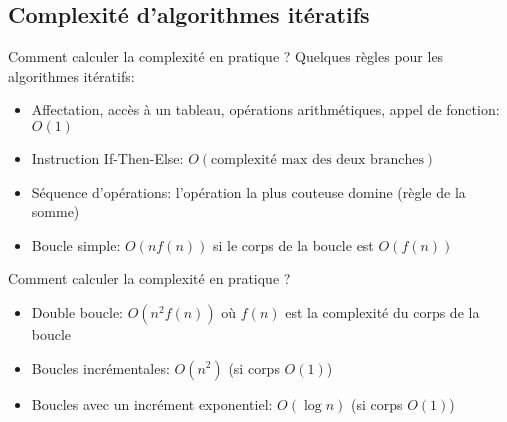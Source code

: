\subsection{Complexité d'algorithmes itératifs}

\begin{frame}{Comment calculer la complexité en pratique ?}
Quelques règles pour les algorithmes itératifs:
\begin{itemize}
\item Affectation, accès à un tableau, opérations arithmétiques, appel de fonction: $O(1)$
\item Instruction If-Then-Else: $O(\mbox{complexité max des deux branches})$
\item Séquence d'opérations: l'opération la plus couteuse domine (règle de la somme)
\item Boucle simple: $O(n f(n))$ si le corps de la boucle est $O(f(n))$
\end{itemize}
\end{frame}

\begin{frame}{Comment calculer la complexité en pratique ?}
\begin{itemize}
\item Double boucle: $O(n^2 f(n))$ où $f(n)$ est la complexité du corps de la boucle
\item Boucles incrémentales: $O(n^2)$ (si corps $O(1)$)
\begin{center}\footnotesize
\end{center}
\item Boucles avec un incrément exponentiel: $O(\log n)$ (si corps $O(1)$)
\begin{center}\footnotesize
\end{center}
\end{itemize}
\end{frame}

